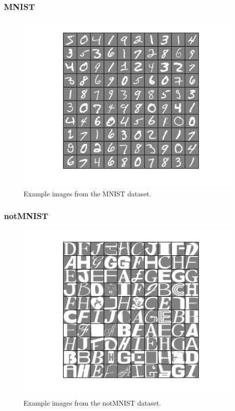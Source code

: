 \documentclass{beamer}
\begin{document}
\begin{frame}
	\frametitle{MNIST}
	\begin{figure}[hbt]
\includegraphics[width=1\textwidth,height=0.8\textheight,keepaspectratio]{mnist_example}
  	\caption{\footnotesize{Example images from the MNIST dataset.}}
	\end{figure}
\end{frame}

\begin{frame}
	\frametitle{notMNIST}
	\begin{figure}[hbt]
\includegraphics[width=1\textwidth,height=0.8\textheight,keepaspectratio]{notMnist_example}
  	\caption{\footnotesize{Example images from the notMNIST dataset.}}
	\end{figure}
\end{frame}
\end{document}
